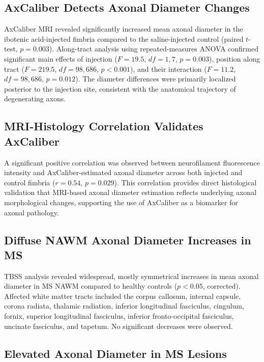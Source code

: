 \documentclass[11pt]{article}
\begin{document}
\subsection{AxCaliber Detects Axonal Diameter Changes}

AxCaliber MRI revealed significantly increased mean axonal diameter in the ibotenic acid-injected fimbria compared to the saline-injected control (paired $t$-test, $p = 0.003$). Along-tract analysis using repeated-measures ANOVA confirmed significant main effects of injection ($F = 19.5$, $df = 1,7$, $p = 0.003$), position along tract ($F = 219.5$, $df = 98,686$, $p < 0.001$), and their interaction ($F = 11.2$, $df = 98,686$, $p = 0.012$). The diameter differences were primarily localized posterior to the injection site, consistent with the anatomical trajectory of degenerating axons.

\subsection{MRI-Histology Correlation Validates AxCaliber}

A significant positive correlation was observed between neurofilament fluorescence intensity and AxCaliber-estimated axonal diameter across both injected and control fimbria ($r = 0.54$, $p = 0.029$). This correlation provides direct histological validation that MRI-based axonal diameter estimation reflects underlying axonal morphological changes, supporting the use of AxCaliber as a biomarker for axonal pathology.

\subsection{Diffuse NAWM Axonal Diameter Increases in MS}

TBSS analysis revealed widespread, mostly symmetrical increases in mean axonal diameter in MS NAWM compared to healthy controls ($p < 0.05$, corrected). Affected white matter tracts included the corpus callosum, internal capsule, corona radiata, thalamic radiation, inferior longitudinal fasciculus, cingulum, fornix, superior longitudinal fasciculus, inferior fronto-occipital fasciculus, uncinate fasciculus, and tapetum. No significant decreases were observed.

\subsection{Elevated Axonal Diameter in MS Lesions}
\end{document}
